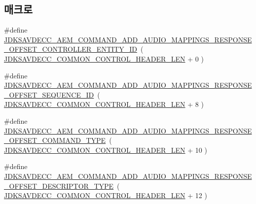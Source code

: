 \subsection*{매크로}
\begin{DoxyCompactItemize}
\item 
\#define \hyperlink{group__command__add__audio__mappings__response_gac257234a818134c0bf32b1eb2c391928}{J\+D\+K\+S\+A\+V\+D\+E\+C\+C\+\_\+\+A\+E\+M\+\_\+\+C\+O\+M\+M\+A\+N\+D\+\_\+\+A\+D\+D\+\_\+\+A\+U\+D\+I\+O\+\_\+\+M\+A\+P\+P\+I\+N\+G\+S\+\_\+\+R\+E\+S\+P\+O\+N\+S\+E\+\_\+\+O\+F\+F\+S\+E\+T\+\_\+\+C\+O\+N\+T\+R\+O\+L\+L\+E\+R\+\_\+\+E\+N\+T\+I\+T\+Y\+\_\+\+ID}~( \hyperlink{group__jdksavdecc__avtp__common__control__header_gaae84052886fb1bb42f3bc5f85b741dff}{J\+D\+K\+S\+A\+V\+D\+E\+C\+C\+\_\+\+C\+O\+M\+M\+O\+N\+\_\+\+C\+O\+N\+T\+R\+O\+L\+\_\+\+H\+E\+A\+D\+E\+R\+\_\+\+L\+EN} + 0 )
\item 
\#define \hyperlink{group__command__add__audio__mappings__response_gae154db596700c73229d9267d702e4114}{J\+D\+K\+S\+A\+V\+D\+E\+C\+C\+\_\+\+A\+E\+M\+\_\+\+C\+O\+M\+M\+A\+N\+D\+\_\+\+A\+D\+D\+\_\+\+A\+U\+D\+I\+O\+\_\+\+M\+A\+P\+P\+I\+N\+G\+S\+\_\+\+R\+E\+S\+P\+O\+N\+S\+E\+\_\+\+O\+F\+F\+S\+E\+T\+\_\+\+S\+E\+Q\+U\+E\+N\+C\+E\+\_\+\+ID}~( \hyperlink{group__jdksavdecc__avtp__common__control__header_gaae84052886fb1bb42f3bc5f85b741dff}{J\+D\+K\+S\+A\+V\+D\+E\+C\+C\+\_\+\+C\+O\+M\+M\+O\+N\+\_\+\+C\+O\+N\+T\+R\+O\+L\+\_\+\+H\+E\+A\+D\+E\+R\+\_\+\+L\+EN} + 8 )
\item 
\#define \hyperlink{group__command__add__audio__mappings__response_gae029af6e193a2569535e9fe76c3bed33}{J\+D\+K\+S\+A\+V\+D\+E\+C\+C\+\_\+\+A\+E\+M\+\_\+\+C\+O\+M\+M\+A\+N\+D\+\_\+\+A\+D\+D\+\_\+\+A\+U\+D\+I\+O\+\_\+\+M\+A\+P\+P\+I\+N\+G\+S\+\_\+\+R\+E\+S\+P\+O\+N\+S\+E\+\_\+\+O\+F\+F\+S\+E\+T\+\_\+\+C\+O\+M\+M\+A\+N\+D\+\_\+\+T\+Y\+PE}~( \hyperlink{group__jdksavdecc__avtp__common__control__header_gaae84052886fb1bb42f3bc5f85b741dff}{J\+D\+K\+S\+A\+V\+D\+E\+C\+C\+\_\+\+C\+O\+M\+M\+O\+N\+\_\+\+C\+O\+N\+T\+R\+O\+L\+\_\+\+H\+E\+A\+D\+E\+R\+\_\+\+L\+EN} + 10 )
\item 
\#define \hyperlink{group__command__add__audio__mappings__response_ga43929177bf6b30c0ad3a6815cfe3627d}{J\+D\+K\+S\+A\+V\+D\+E\+C\+C\+\_\+\+A\+E\+M\+\_\+\+C\+O\+M\+M\+A\+N\+D\+\_\+\+A\+D\+D\+\_\+\+A\+U\+D\+I\+O\+\_\+\+M\+A\+P\+P\+I\+N\+G\+S\+\_\+\+R\+E\+S\+P\+O\+N\+S\+E\+\_\+\+O\+F\+F\+S\+E\+T\+\_\+\+D\+E\+S\+C\+R\+I\+P\+T\+O\+R\+\_\+\+T\+Y\+PE}~( \hyperlink{group__jdksavdecc__avtp__common__control__header_gaae84052886fb1bb42f3bc5f85b741dff}{J\+D\+K\+S\+A\+V\+D\+E\+C\+C\+\_\+\+C\+O\+M\+M\+O\+N\+\_\+\+C\+O\+N\+T\+R\+O\+L\+\_\+\+H\+E\+A\+D\+E\+R\+\_\+\+L\+EN} + 12 )

\end{DoxyCompactItemize}
